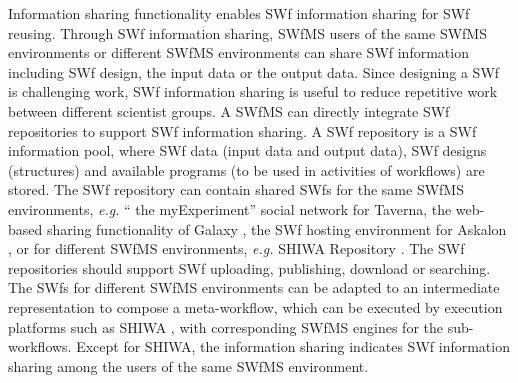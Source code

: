 Information sharing functionality enables SWf information sharing for SWf reusing. Through SWf information sharing, SWfMS users of the same SWfMS environments or different SWfMS environments can share SWf information including SWf design, the input data or the output data.
Since designing a SWf is challenging work, SWf information sharing is useful to reduce repetitive work between different scientist groups. 
A SWfMS can directly integrate SWf repositories to support SWf information sharing. 
A SWf repository is a SWf information pool, where SWf data (input data and output data), SWf designs (structures) and available programs (to be used in activities of workflows) are stored. 
The SWf repository can contain shared SWfs for the same
SWfMS environments, \textit{e.g.} \textquotedblleft{} the
myExperiment\textquotedblright{} social network
\cite{Wolstencroft2013} for Taverna, the web-based sharing
functionality of Galaxy \cite{Goecks2010}, the SWf hosting
environment for Askalon \cite{Hernandez},
or for different SWfMS environments, \textit{e.g.} SHIWA Repository \cite{Tersty2014}.
The SWf repositories should support SWf uploading, publishing, download or searching.
The SWfs for different SWfMS environments can be adapted to an intermediate representation \cite{Plankensteiner2013} to compose a meta-workflow, which can be executed by execution platforms such as SHIWA \cite{Tersty2014a}, with corresponding SWfMS engines for the sub-workflows.
Except for SHIWA, the information sharing indicates SWf information sharing among the users of the same SWfMS environment.


